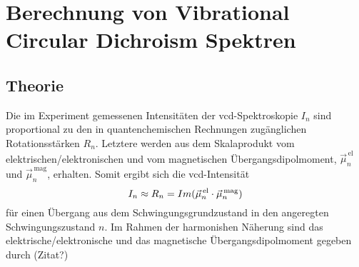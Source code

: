 \section{Berechnung von Vibrational Circular Dichroism Spektren}
	\subsection{Theorie}
	Die im Experiment gemessenen Intensitäten der \ac{vcd}-Spektroskopie $I_n$ sind proportional zu den in quantenchemischen Rechnungen zugänglichen Rotationsstärken $R_n$. Letztere werden aus dem Skalaprodukt vom \textcolor{myred}{elektrischen/\-elektronischen} und vom magnetischen Übergangsdipolmoment, $\vec{\mu}_n^{\,\text{el}}$ und $\vec{\mu}_n^{\,\text{mag}}$,  erhalten. Somit ergibt sich die \ac{vcd}-Intensität
	\begin{equation}
	  I_n\approx R_n = Im(\vec{\mu}_n^{\,\text{el}}\cdot\vec{\mu}_n^{\text{\,mag}})
	\end{equation}
	für einen Übergang aus dem Schwingungsgrundzustand in den angeregten Schwingungszustand $n$.\supercite{stephens1985theory,stephens1985vibrational} Im Rahmen der harmonishen Näherung sind das \textcolor{myred}{elektrische/\-elektronische} und das magnetische Übergangsdipolmoment gegeben durch \textcolor{myred}{(Zitat?)}
	
